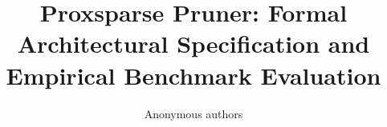 \title{\textbf{Proxsparse Pruner: Formal Architectural Specification and Empirical Benchmark Evaluation}}

\author{Anonymous authors}
